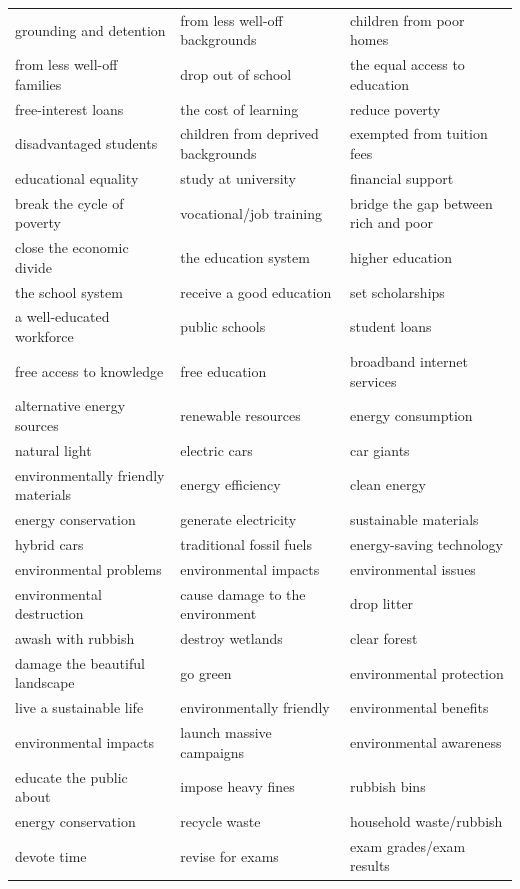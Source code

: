 \documentclass[10pt,a4paper]{article}
\begin{document}
{\begin{longtable}{@{}*{3}{p{}}@{}}
grounding and detention & from less well-off backgrounds & children from poor homes \\
from less well-off families & drop out of school & the equal access to education \\
free-interest loans & the cost of learning & reduce poverty \\
disadvantaged students & children from deprived backgrounds & exempted from tuition fees \\
educational equality & study at university & financial support \\
break the cycle of poverty & vocational/job training & bridge the gap between rich and poor \\
close the economic divide & the education system & higher education \\
the school system & receive a good education & set scholarships \\
a well-educated workforce & public schools & student loans \\
free access to knowledge & free education & broadband internet services \\
alternative energy sources & renewable resources & energy consumption \\
natural light & electric cars & car giants \\
environmentally friendly materials & energy efficiency & clean energy \\
energy conservation & generate electricity & sustainable materials \\
hybrid cars & traditional fossil fuels & energy-saving technology \\
environmental problems & environmental impacts & environmental issues \\
environmental destruction & cause damage to the environment & drop litter \\
awash with rubbish & destroy wetlands & clear forest \\
damage the beautiful landscape & go green & environmental protection \\
live a sustainable life & environmentally friendly & environmental benefits \\
environmental impacts & launch massive campaigns & environmental awareness \\
educate the public about & impose heavy fines & rubbish bins \\
energy conservation & recycle waste & household waste/rubbish \\
devote time & revise for exams & exam grades/exam results \\

\end{longtable}}
\end{document}
